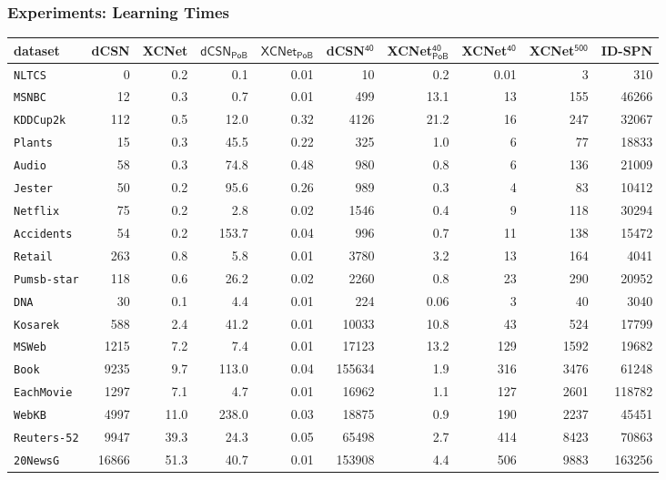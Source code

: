 \documentclass[xcolor={usenames,dvipsnames,svgnames}, compress]{beamer}
\begin{document}
\begin{frame}[t]
  \frametitle{Experiments: Learning Times}

  \begin{table}[t]
  \centering
  \setlength{\tabcolsep}{1pt}  
\tiny
  \begin{tabular}{l rrr r r r r r r}
    dataset           & \textsf{dCSN} & \textsf{XCNet} & $\mathsf{dCSN_{PoB}}$ &
    $\mathsf{XCNet_{PoB}}$ &\textsf{dCSN$^{\mathsf{40}}$} & \textsf{XCNet$^{\mathsf{40}}_\mathsf{PoB}$}& \textsf{XCNet$^{\mathsf{40}}$} & \textsf{XCNet$^{\mathsf{500}}$} & \textsf{ID-SPN}\\
    \midrule
    \texttt{NLTCS}& 0&0.2&0.1	&0.01&10&0.2& 0.01 & 3 &310\\ 
    \texttt{MSNBC} & 12&0.3&0.7&	0.01&499&13.1& 13 & 155 &46266\\ 
    \texttt{KDDCup2k}&112&0.5&12.0&0.32&4126&21.2& 16& 247 &32067\\ 
    \texttt{Plants}&15&0.3&45.5	&0.22&325&1.0& 6 & 77 &18833\\ 
    \texttt{Audio} & 58&0.3&74.8&0.48&980&0.8&6 &136 &21009\\ 
    \texttt{Jester}&50&0.2&95.6&	0.26&989&0.3&4 & 83 &10412\\ 
    \texttt{Netflix}&75&0.2&2.8&	0.02&1546&0.4& 9& 118&30294\\ 
    \texttt{Accidents}&54&0.2&153.7	&0.04&996&0.7& 11& 138 &15472\\ 
    \texttt{Retail}&263&0.8&5.8	&0.01&3780&3.2& 13 & 164&4041\\ 
    \texttt{Pumsb-star}&118&0.6&26.2&	0.02&2260&0.8& 23 & 290 &20952\\ 
    \texttt{DNA}&30&0.1&4.4&	0.01&224&0.06& 3& 40 &3040\\ 
    \texttt{Kosarek}&588&2.4&41.2&	0.01&10033&10.8& 43 &524 &17799\\ 
    \texttt{MSWeb}&1215&7.2&7.4	&0.01&17123&13.2& 129 & 1592 &19682\\ 
    \texttt{Book}&9235&9.7&113.0	&0.04&155634&1.9& 316& 3476&61248\\ 
    \texttt{EachMovie}&1297&7.1&4.7	&0.01&16962&1.1& 127 & 2601&118782\\ 
    \texttt{WebKB}&4997&11.0&238.0&	0.03&18875&0.9& 190 & 2237 &45451\\ 
    \texttt{Reuters-52}&9947&39.3&24.3&	0.05&65498&2.7& 414 & 8423 &70863\\ 
    \texttt{20NewsG}&16866&51.3&40.7&	0.01&153908&4.4& 506& 9883&163256\\ 

\end{tabular}
\end{table}
\end{frame}
\end{document}
